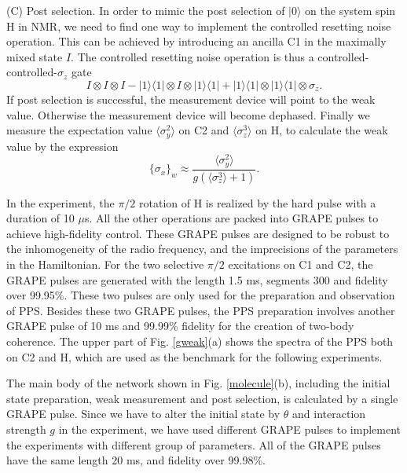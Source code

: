 \documentclass[prl,twocolumn,showpacs]{revtex4}
\begin{document}
 (C) Post selection. In order to mimic the post selection of $|0\rangle$ on the system spin H in NMR, we need to find one way to implement the controlled resetting noise operation. This can be achieved by introducing an ancilla C1 in the maximally mixed state $I$. The controlled resetting noise operation is thus a controlled-controlled-$\sigma_z$ gate
 \begin{equation}\label{postselection}
I\otimes I \otimes I - |1\rangle \langle 1 | \otimes I \otimes  |1\rangle \langle 1 | + |1\rangle \langle 1 | \otimes |1\rangle \langle 1 | \otimes \sigma_z.
 \end{equation}
 If post selection is successful, the measurement device will point to the weak value. Otherwise the measurement device will become dephased. Finally we measure the expectation value $\langle \sigma_y^2 \rangle$ on C2 and $\langle \sigma_z^3 \rangle$ on H, to calculate the weak value by the expression
 \begin{equation}\label{weakvalue}
\{ \sigma_x \}_w \approx \frac{\langle \sigma_y^2 \rangle}{ g(\langle \sigma_z^3 \rangle+1)}.
 \end{equation}

In the experiment, the $\pi/2$ rotation of H is realized by the hard pulse with a duration of 10 $\mu$s. All the other operations are packed into GRAPE pulses to achieve high-fidelity control. These GRAPE pulses are designed to be robust to the inhomogeneity of the radio frequency, and the imprecisions of the parameters in the Hamiltonian. For the two selective $\pi/2$ excitations on C1 and C2, the GRAPE pulses are generated with the length 1.5 ms, segments 300 and fidelity over 99.95\%. These two pulses are only used for the preparation and observation of PPS. Besides these two GRAPE pulses, the PPS preparation involves another GRAPE pulse of 10 ms and 99.99\% fidelity for the creation of two-body coherence. The upper part of Fig. \ref{gweak}(a) shows the spectra of the PPS both on C2 and H, which are used as the benchmark for the following experiments.

The main body of the network shown in Fig. \ref{molecule}(b), including the initial state preparation, weak measurement and post selection, is calculated by a single GRAPE pulse. Since we have to alter the initial state by $\theta$ and interaction strength $g$ in the experiment, we have used different GRAPE pulses to implement the experiments with different group of parameters. All of the GRAPE pulses have the same length 20 ms, and fidelity over 99.98\%. 
\end{document}
